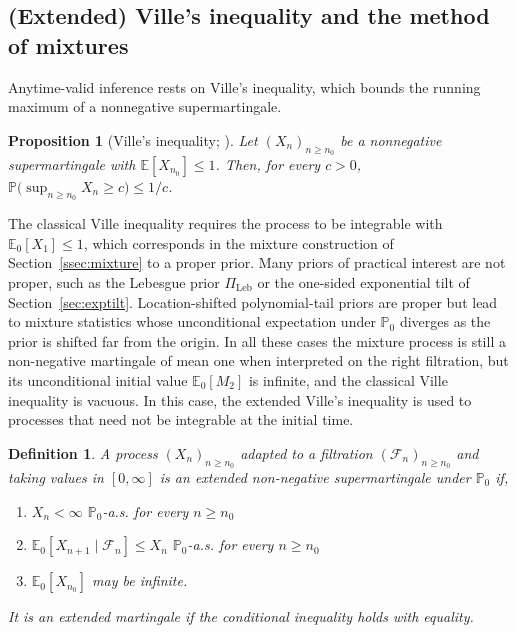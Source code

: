 \documentclass[numsec,webpdf,modern,medium,namedate]{oup-authoring-template}
\theoremstyle{thmstyleone}%
\newtheorem{proposition}[theorem]{Proposition}%
\theoremstyle{thmstyletwo}%
\theoremstyle{thmstylethree}%
\newtheorem{definition}{Definition}
\newcommand{\E}{\mathbb{E}}
\newcommand{\Prob}{\mathbb{P}}
\newcommand{\1}{\mathbf{1}}
\begin{document}
\subsection{(Extended) Ville's inequality and the method of mixtures}\label{ssec:ville}

Anytime-valid inference rests on Ville's inequality, which bounds the running
maximum of a nonnegative supermartingale.
\begin{proposition}[Ville's inequality; \citealp{ville1939etude}]\label{prop:ville}
Let $(X_n)_{n\geq n_0}$ be a nonnegative supermartingale with
$\E[X_{n_0}]\leq 1$. Then, for every $c>0$,
$\Prob\bigl(\sup_{n\geq n_0} X_n\geq c\bigr)\leq 1/c$.
\end{proposition}
The classical Ville inequality requires the process to be integrable with \(\E_0[X_1]\leq 1\), which corresponds in the mixture construction of Section~\ref{ssec:mixture} to a proper prior. Many priors of practical interest are not proper, such as the Lebesgue prior \(\Pi_{\mathrm{Leb}}\) or the one-sided exponential tilt of Section~\ref{sec:exptilt}. Location-shifted polynomial-tail priors are proper but lead to mixture statistics whose unconditional expectation under \(\mathbb{P}_0\) diverges as the prior is shifted far from the origin. In all these cases the mixture process is still a non-negative martingale of mean one when interpreted on the right filtration, but its unconditional initial value \(\E_0[M_2]\) is infinite, and the classical Ville inequality is vacuous. In this case, the extended Ville's inequality is used to processes
that need not be integrable at the initial time.
\begin{definition}
    A process \((X_n)_{n\geq n_0}\) adapted to a filtration \((\mathcal{F}_n)_{n\geq n_0}\) and taking values in \([0,\infty]\) is an extended non-negative supermartingale under \(\mathbb{P}_0\) if,
\begin{enumerate}
\item[(i)] \(X_n<\infty\) \(\mathbb{P}_0\)-a.s. for every \(n\geq n_0\)
\item[(ii)] \(\E_0[X_{n+1}\mid \mathcal{F}_n] \leq X_n\) \(\mathbb{P}_0\)-a.s. for every \(n\geq n_0\)
\item[(iii)] \(\E_0[X_{n_0}]\) may be infinite.
\end{enumerate}
It is an extended martingale if the conditional inequality holds with equality.
\end{definition}
\end{document}
